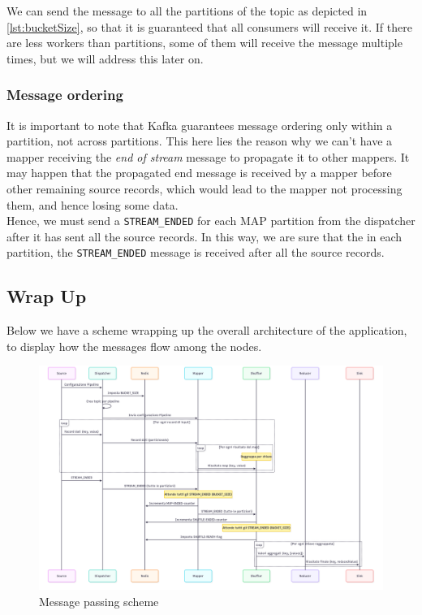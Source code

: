 We can send the message to all the partitions of the topic as depicted in \ref{lst:bucketSize}, so that it is guaranteed that all consumers will receive it. If there are less workers than partitions, some of them will receive the message multiple times, but we will address this later on.

\subsubsection{Message ordering}
It is important to note that Kafka guarantees message ordering only within a partition, not across partitions.
This here lies the reason why we can't have a mapper receiving the \textit{end of stream} message to propagate it to other mappers. It may happen that the propagated end message is received by a mapper before other remaining source records, which would lead to the mapper not processing them, and hence losing some data.\\
Hence, we must send a \lstinline|STREAM_ENDED| for each MAP partition from the dispatcher after it has sent all the source records.
In this way, we are sure that the in each partition, the \lstinline|STREAM_ENDED| message is received after all the source records.

\newpage
\subsection{Wrap Up}
Below we have a scheme wrapping up the overall architecture of the application, to display how the messages flow among the nodes.

\begin{figure}[htbp]
   \centering
   \includegraphics[width=\columnwidth]{images/messagePassing.png}
   \caption{Message passing scheme}
   \label{fig:messagePassing}
\end{figure}

